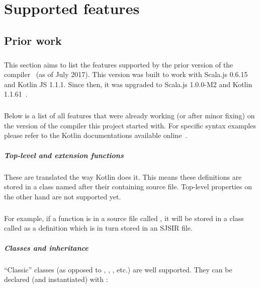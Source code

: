 \chapter{Supported features} \label{features}
\section{Prior work} \label{initial_status}
  
\paragraph{} This section aims to list the features supported by the prior version of the 
compiler~\cite{kotlin_scalajs_v1} (as of July 2017). This version was built to work with 
Scala.js 0.6.15 and Kotlin JS 1.1.1. Since then, it was upgraded to Scala.js 1.0.0-M2 and Kotlin 
1.1.61~\cite{kotlin_version}.

\paragraph{} Below is a list of all features that were already working (or after minor fixing) on 
the version of the compiler this project started with. For specific syntax examples please refer to 
the Kotlin documentations available online~\cite{kotlin_docs}.

\paragraph{Top-level and extension functions} These are translated the way Kotlin does it. This 
means these definitions are stored in a class named after their containing source file. Top-level 
properties on the other hand are not supported yet.

\paragraph{} For example, if a function  is 
in a source file called , it will be stored in a class called 
 as a  definition which is in turn stored in an SJSIR file.

\paragraph{Classes and inheritance} \enquote{Classic} classes  (as opposed to , 
, , etc.) are well supported. They can be declared
(and instantiated) with :

